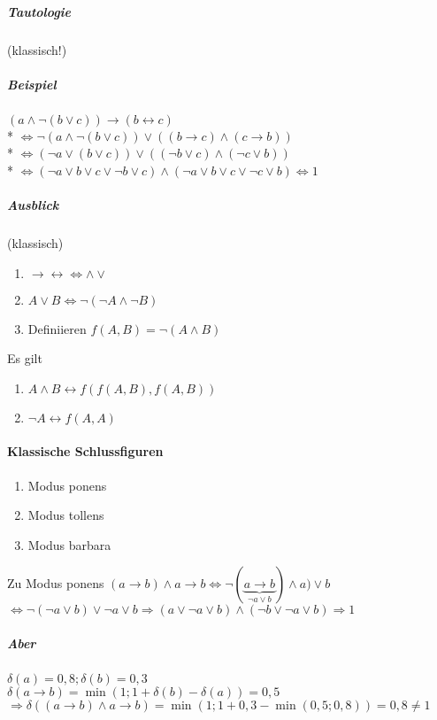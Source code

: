 \documentclass[a4paper]{scrartcl}
\begin{document}
\subparagraph{Tautologie} (klassisch!)
\subparagraph{Beispiel} $(a \wedge \neg (b \vee c)) \rightarrow (b \leftrightarrow c)$\\*
$\Leftrightarrow \neg (a \wedge \neg (b \vee c)) \vee ((b \rightarrow c) \wedge (c \rightarrow b))$\\*
$\Leftrightarrow ( \neg a \vee (b \vee c)) \vee ((\neg b \vee c ) \wedge (\neg c \vee b))$\\*
$\Leftrightarrow (\neg a \vee b \vee c \vee \neg b \vee c ) \wedge (\neg a \vee b \vee c \vee \neg c  \vee b ) \Leftrightarrow 1$

\subparagraph{Ausblick} (klassisch)
\begin{enumerate}
\item $\rightarrow \leftrightarrow \Leftrightarrow \wedge \vee$
\item $ A \vee B \Leftrightarrow \neg (\neg A \wedge \neg B)$
\item Definiieren $f(A,B) = \neg (A \wedge B)$
\end{enumerate}
Es gilt
\begin{enumerate}
\item $A \wedge B \leftrightarrow f(f(A,B),f(A,B))$
\item $\neg A \leftrightarrow f(A,A)$
\end{enumerate}

\paragraph{Klassische Schlussfiguren}
\begin{enumerate}
\item Modus ponens
\item Modus tollens
\item Modus barbara
\end{enumerate}
Zu Modus ponens $(a \rightarrow b) \wedge a \rightarrow b \Leftrightarrow \neg (\underbrace{a \rightarrow b}_{\neg a \vee b} ) \wedge a) \vee b$\\
$\Leftrightarrow \neg (\neg a \vee b) \vee \neg a \vee b \Rightarrow (a \vee \neg a \vee b) \wedge (\neg b \vee \neg a \vee b) \Rightarrow 1$\\
\subparagraph{Aber} $\delta (a) = 0,8; \delta (b) = 0,3$\\
$\delta (a \rightarrow b) = \min ( 1 ; 1 + \delta (b) - \delta (a) ) = 0,5$\\
$\Rightarrow \delta ((a \rightarrow b) \wedge a \rightarrow b ) = \min (1; 1 + 0,3 - \min (0,5;0,8)) = 0,8 \neq 1$
\end{document}
